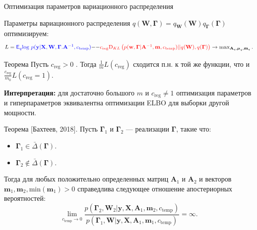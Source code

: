 \documentclass[usenames,dvipsnames,10pt,pdf,utf8,russian,aspectratio=43]{beamer}
\begin{document}
\begin{frame}{Оптимизация параметров вариационного распределения}

Параметры вариационного распределения $q(\mathbf{W}, \boldsymbol{\Gamma}) = q_{\mathbf{W}}(\mathbf{W})q_{\boldsymbol{\Gamma}}(\boldsymbol{\Gamma})$ оптимизируем:
\[
L =
\textcolor{blue}{\mathsf{E}_q \text{log}~{p(\mathbf{y} | \mathbf{X}, \mathbf{W}, \boldsymbol{\Gamma}. \mathbf{A}^{-1}, c_{\text{temp}})}} -$$ $$- \textcolor{red}{c_\text{reg}\text{D}_{KL}\left(p(\mathbf{w}, \boldsymbol{\Gamma} |\mathbf{A}^{-1}, \mathbf{m}, c_{\text{temp}}) || q(\mathbf{W}), q(\boldsymbol{\Gamma})\right)} \to \max_{\mathbf{A}_q, \boldsymbol{\mu}_q, \mathbf{m}_q}.
\]

\begin{block}{Теорема}
Пусть $c_\text{reg} > 0$ .
Тогда $\frac{1}{m}L(c_\text{reg})$ сходится п.н. к той же функции, что и $\frac{c_\text{reg}}{m_0}L(c_\text{reg}=1)$.
\end{block}
\textbf{Интерпретация: } для достаточно большого $m$ и $c_\text{reg} \neq 1$ оптимизация параметров и гиперпараметров эквивалентна оптимизации ELBO для выборки другой мощности.
\end{frame}
\begin{frame}

\begin{block}{Теорема  [Бахтеев, 2018].}
Пусть $\boldsymbol{\Gamma}_1$ и $\boldsymbol{\Gamma}_2$ --- реализации $\boldsymbol{\Gamma}$, такие что:
\begin{itemize}
\item $\boldsymbol{\Gamma}_1 \in \bar{\Delta}(\boldsymbol{\Gamma})$.
\item $\boldsymbol{\Gamma}_2 \not \in \bar{\Delta}(\boldsymbol{\Gamma})$.
\end{itemize} 
Тогда для любых положительно определенных матриц $\mathbf{A}_1$ и $\mathbf{A}_2$ и векторов $\mathbf{m}_1, \mathbf{m}_2, \text{min}(\mathbf{m}_1)>0$ справедлива следующее отношение апостериорных вероятностей:
$$\lim_{c_\text{temp} \to 0} \frac{p(\boldsymbol{\Gamma}_2, \mathbf{W}_2|\mathbf{y},  \mathbf{X},\mathbf{A}_1,\mathbf{m}_2, {c_\text{temp}})}{p(\boldsymbol{\Gamma}_1,  \mathbf{W}|\mathbf{y}, \mathbf{X},\mathbf{A}_1,\mathbf{m}_1, {c_\text{temp}})} = \infty.$$
\end{block}
\end{frame}
\end{document}
